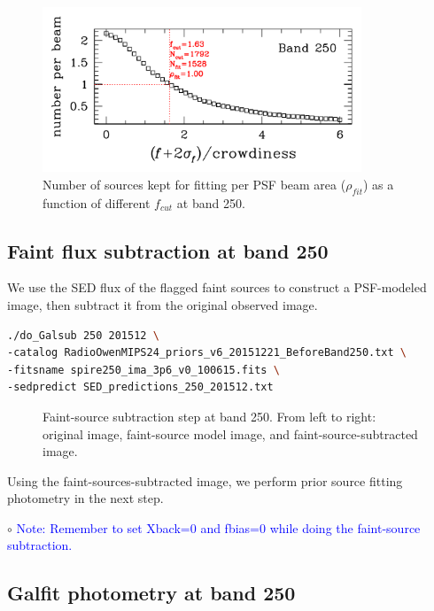 \documentclass[11pt,a4paper]{article}
\begin{document}
\begin{figure}[H]
	\caption{Number of sources kept for fitting per PSF beam area ($\rho_{fit}$) as a function of different $f_{cut}$ at band 250.}
	\includegraphics[width=0.85\textwidth]{plot_cutting_flux_250_with_crow}
\end{figure}

\subsection{Faint flux subtraction at band 250}
\label{Band250_Galsub}

We use the SED flux of the flagged faint sources to construct a PSF-modeled image, then subtract it from the original observed image. 

\begin{lstlisting}[language=bash]
./do_Galsub 250 201512 \
-catalog RadioOwenMIPS24_priors_v6_20151221_BeforeBand250.txt \
-fitsname spire250_ima_3p6_v0_100615.fits \
-sedpredict SED_predictions_250_201512.txt
\end{lstlisting}

\begin{figure}[H]
	\caption{Faint-source subtraction step at band 250. From left to right: original image, faint-source model image, and faint-source-subtracted image.}
\end{figure}

Using the faint-sources-subtracted image, we perform prior source fitting photometry in the next step. 

\indent\hspace{15pt}$\circ$ 
\textcolor{blue}{Note: Remember to set Xback=0 and fbias=0 while doing the faint-source subtraction.}
\\

\subsection{Galfit photometry at band 250}
\label{Band250_Galfit}
\end{document}
